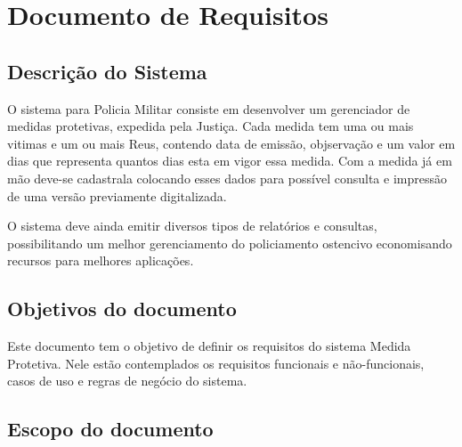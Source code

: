 \documentclass[
	12pt,				%
    oneside,			%
	a4paper,			%
	chapter=TITLE,		%
	english,			%
	french,				%
	spanish,			%
	brazil,				%
	]{abntex2}
\begin{document}
\frenchspacing 


\imprimircapa

\imprimirfolhaderosto*

\tableofcontents

\textual



\chapter{Documento de Requisitos} %
	\section{Descrição do Sistema}
		O sistema para Policia Militar consiste em desenvolver um gerenciador de medidas protetivas, expedida pela Justiça. Cada medida tem uma ou mais vitimas e um ou mais Reus, contendo data de emissão, objservação e um valor em dias que representa quantos dias esta em vigor essa medida. Com a medida já em mão deve-se cadastrala colocando esses dados para possível consulta e impressão de uma versão previamente digitalizada.
	
		O sistema deve ainda emitir diversos tipos de relatórios e consultas, possibilitando um melhor gerenciamento do policiamento ostencivo economisando recursos para melhores aplicações.
		
	\section{Objetivos do documento}
	
		Este documento tem o objetivo de definir os requisitos do sistema Medida Protetiva. Nele estão contemplados os requisitos funcionais e não-funcionais, casos de uso e regras de negócio do sistema.
	
	\section{Escopo do documento}
	
\end{document}
